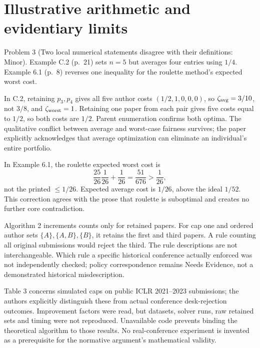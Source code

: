 \documentclass[10pt]{article}
\begin{document}
\section*{Illustrative arithmetic and evidentiary limits}
Problem 3 (Two local numerical statements disagree with their definitions: Minor).  Example C.2 (p. 21) sets \(n=5\) but averages four entries using \(1/4\). Example 6.1 (p. 8) reverses one inequality for the roulette method’s expected worst cost.\par
In C.2, retaining \(p_3,p_4\) gives all five author costs \((1/2,1,0,0,0)\), so \(\zeta_{\rm avg}=3/10\), not \(3/8\), and \(\zeta_{\rm worst}=1\). Retaining one paper from each pair gives five costs equal to \(1/2\), so both costs are \(1/2\). Parent enumeration confirms both optima. The qualitative conflict between average and worst-case fairness survives; the paper explicitly acknowledges that average optimization can eliminate an individual’s entire portfolio.\par
In Example 6.1, the roulette expected worst cost is \[\frac{25}{26}\frac1{26}+\frac1{26}
=\frac{51}{676}>\frac1{26},\] not the printed \(\le1/26\). Expected average cost is \(1/26\), above the ideal \(1/52\). This correction agrees with the prose that roulette is suboptimal and creates no further core contradiction.\par
Algorithm 2 increments counts only for retained papers. For cap one and ordered author sets \(\{A\},\{A,B\},\{B\}\), it retains the first and third papers. A rule counting all original submissions would reject the third. The rule descriptions are not interchangeable. Which rule a specific historical conference actually enforced was not independently checked; policy correspondence remains Needs Evidence, not a demonstrated historical misdescription.\par
Table 3 concerns simulated caps on public ICLR 2021–2023 submissions; the authors explicitly distinguish these from actual conference desk-rejection outcomes. Improvement factors were read, but datasets, solver runs, raw retained sets and timing were not reproduced. Unavailable code prevents binding the theoretical algorithm to those results. No real-conference experiment is invented as a prerequisite for the normative argument’s mathematical validity.\par
\end{document}
